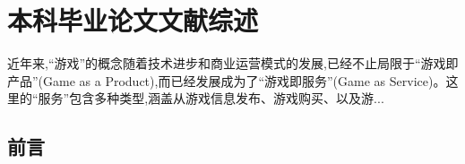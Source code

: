 {
\renewcommand{\baselinestretch}{1.25}\selectfont

{
  \titleformat{\chapter}[block]{\erhao\songti\bfseries\filcenter}{}{0em}{}{}
  \chapter{本科毕业论文文献综述}
}

近年来,“游戏”的概念随着技术进步和商业运营模式的发展,已经不止局限于“游戏即产品”(Game as a Product),而已经发展成为了“游戏即服务”(Game as Service)。这里的“服务”包含多种类型,涵盖从游戏信息发布、游戏购买、以及游...

\section{前言}




}

